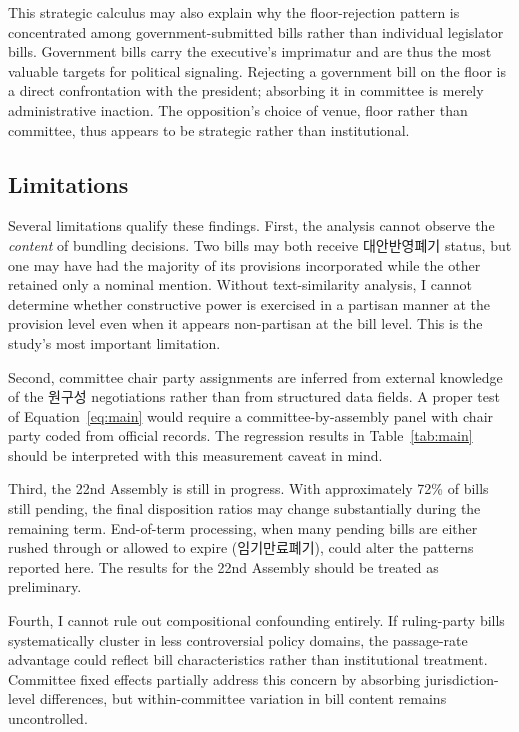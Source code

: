 \documentclass[11pt]{article}
\begin{document}
This strategic calculus may also explain why the floor-rejection pattern is concentrated among government-submitted bills rather than individual legislator bills. Government bills carry the executive's imprimatur and are thus the most valuable targets for political signaling. Rejecting a government bill on the floor is a direct confrontation with the president; absorbing it in committee is merely administrative inaction. The opposition's choice of venue, floor rather than committee, thus appears to be strategic rather than institutional.

\subsection{Limitations}

Several limitations qualify these findings. First, the analysis cannot observe the \textit{content} of bundling decisions. Two bills may both receive 대안반영폐기 status, but one may have had the majority of its provisions incorporated while the other retained only a nominal mention. Without text-similarity analysis, I cannot determine whether constructive power is exercised in a partisan manner at the provision level even when it appears non-partisan at the bill level. This is the study's most important limitation.

Second, committee chair party assignments are inferred from external knowledge of the 원구성 negotiations rather than from structured data fields. A proper test of Equation~\ref{eq:main} would require a committee-by-assembly panel with chair party coded from official records. The regression results in Table~\ref{tab:main} should be interpreted with this measurement caveat in mind.

Third, the 22nd Assembly is still in progress. With approximately 72\% of bills still pending, the final disposition ratios may change substantially during the remaining term. End-of-term processing, when many pending bills are either rushed through or allowed to expire (임기만료폐기), could alter the patterns reported here. The results for the 22nd Assembly should be treated as preliminary.

Fourth, I cannot rule out compositional confounding entirely. If ruling-party bills systematically cluster in less controversial policy domains, the passage-rate advantage could reflect bill characteristics rather than institutional treatment. Committee fixed effects partially address this concern by absorbing jurisdiction-level differences, but within-committee variation in bill content remains uncontrolled.
\end{document}
